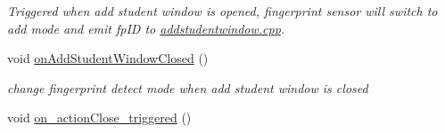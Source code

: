 \begin{DoxyCompactItemize}
\begin{DoxyCompactList}\small\item\em Triggered when add student window is opened, fingerprint sensor will switch to add mode and emit fp\+I\+D to \hyperlink{addstudentwindow_8cpp}{addstudentwindow.\+cpp}. \end{DoxyCompactList}\item 
void \hyperlink{class_main_window_afe50cd282014bcb4698a892d2710cdac}{on\+Add\+Student\+Window\+Closed} ()
\begin{DoxyCompactList}\small\item\em change fingerprint detect mode when add student window is closed \end{DoxyCompactList}\item 
void \hyperlink{class_main_window_a189b458b701fa572969a22f8718ce5b0}{on\+\_\+action\+Close\+\_\+triggered} ()
\end{DoxyCompactItemize}
